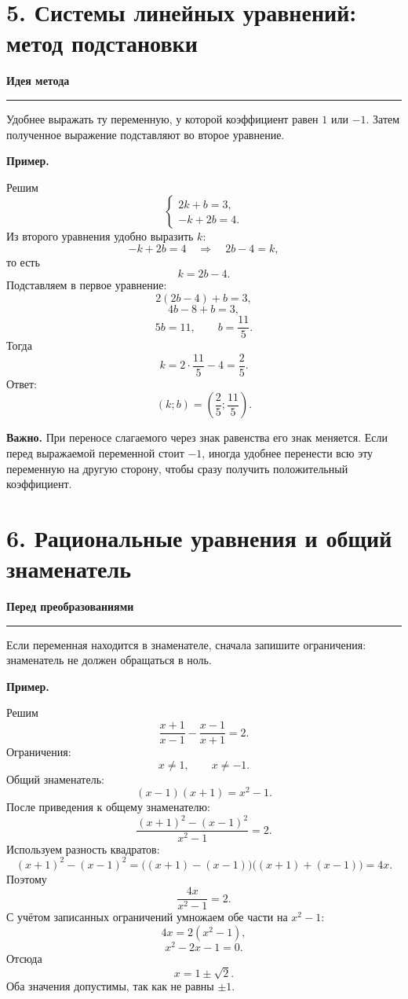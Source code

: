 \documentclass[a4paper,12pt]{article}
\newcommand{\keyidea}[1]{%
  \par\medskip
  {\bfseries\color{darkaccent}#1}\par
  \vspace{1pt}
  {\color{accent}\rule{\linewidth}{0.55pt}}\par
  \vspace{2pt}
}
\newcommand{\important}[1]{%
  \par\smallskip
  \noindent\textbf{\color{darkaccent}Важно.} #1\par
}
\newcommand{\exampletitle}{%
  \par\smallskip
  \noindent\textbf{\color{accent}Пример.}\enspace
}
\begin{document}
\clearpage

\section{5. Системы линейных уравнений: метод подстановки}

\keyidea{Идея метода}
Удобнее выражать ту переменную, у которой коэффициент равен \(1\) или \(-1\). Затем полученное выражение подставляют во второе уравнение.

\exampletitle
Решим
\[
\begin{cases}
2k+b=3,\\
-k+2b=4.
\end{cases}
\]
Из второго уравнения удобно выразить \(k\):
\[
-k+2b=4
\quad\Longrightarrow\quad
2b-4=k,
\]
то есть
\[
k=2b-4.
\]
Подставляем в первое уравнение:
\[
2(2b-4)+b=3,
\]
\[
4b-8+b=3,
\]
\[
5b=11,
\qquad
b=\frac{11}{5}.
\]
Тогда
\[
k=2\cdot\frac{11}{5}-4=\frac25.
\]
Ответ:
\[
(k;b)=\left(\frac25;\frac{11}{5}\right).
\]

\important{При переносе слагаемого через знак равенства его знак меняется. Если перед выражаемой переменной стоит \(-1\), иногда удобнее перенести всю эту переменную на другую сторону, чтобы сразу получить положительный коэффициент.}

\section{6. Рациональные уравнения и общий знаменатель}

\keyidea{Перед преобразованиями}
Если переменная находится в знаменателе, сначала запишите ограничения: знаменатель не должен обращаться в ноль.

\exampletitle
Решим
\[
\frac{x+1}{x-1}-\frac{x-1}{x+1}=2.
\]
Ограничения:
\[
x\ne1,
\qquad
x\ne-1.
\]
Общий знаменатель:
\[
(x-1)(x+1)=x^2-1.
\]
После приведения к общему знаменателю:
\[
\frac{(x+1)^2-(x-1)^2}{x^2-1}=2.
\]
Используем разность квадратов:
\[
(x+1)^2-(x-1)^2
=
\bigl((x+1)-(x-1)\bigr)
\bigl((x+1)+(x-1)\bigr)
=4x.
\]
Поэтому
\[
\frac{4x}{x^2-1}=2.
\]
С учётом записанных ограничений умножаем обе части на \(x^2-1\):
\[
4x=2(x^2-1),
\]
\[
x^2-2x-1=0.
\]
Отсюда
\[
x=1\pm\sqrt2.
\]
Оба значения допустимы, так как не равны \(\pm1\).
\end{document}
